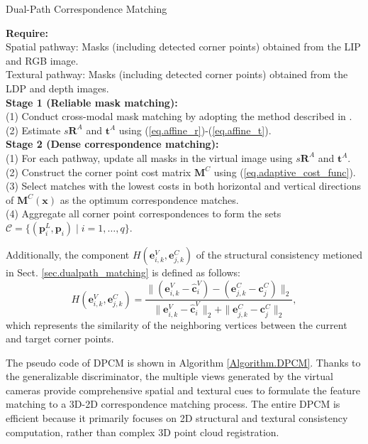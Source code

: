 \begin{algorithm}[t!]
\caption{Dual-Path Correspondence Matching}
\textbf{Require:}\\
Spatial pathway: Masks (including detected corner points) obtained from the LIP and RGB image. \\
Textural pathway: Masks (including detected corner points) obtained from the LDP and depth images.\\
\textbf{Stage 1 (Reliable mask matching):} \\
(1) Conduct cross-modal mask matching by adopting the method described in \cite{zhiwei2024lcec}. \\
(2) Estimate $s\boldsymbol{R}^A$ and $\boldsymbol{t}^A$ using (\ref{eq.affine_r})-(\ref{eq.affine_t}).\\
\textbf{Stage 2 (Dense correspondence matching):} \\
(1) For each pathway, update all masks in the virtual image using $s\boldsymbol{R}^A$ and $\boldsymbol{t}^A$.\\
(2) Construct the corner point cost matrix $\boldsymbol{M}^C$ using (\ref{eq.adaptive_cost_func}).
(3) Select matches with the lowest costs in both horizontal and vertical directions of $\boldsymbol{M}^{C}(\boldsymbol{x})$ as the optimum correspondence matches. \\
(4) Aggregate all corner point correspondences to form the sets $\mathcal{C} = \{(\boldsymbol{p}^L_i,\boldsymbol{p}_i) \mid i = 1,\dots, q\}$.
\label{Algorithm.DPCM}
\end{algorithm} 


Additionally, the component $H(\boldsymbol{e}^V_{i,k},\boldsymbol{e}^C_{j,k})$ of the structural consistency metioned in Sect. \ref{sec.dualpath_matching} is defined as follows:
\begin{equation}
H(\boldsymbol{e}^V_{i,k},\boldsymbol{e}^C_{j,k}) = {\frac{\| (\boldsymbol{e}^V_{i,k} - \hat{\boldsymbol{c}}^V_{i} ) -(\boldsymbol{e}^C_{j,k} - \boldsymbol{c}_j^C )\|_2}{\|  \boldsymbol{e}^V_{i,k} - \hat{\boldsymbol{c}}^V_{i}  \|_2 + \| \boldsymbol{e}^C_{j,k} - \boldsymbol{c}_j^C \|_2}},
\label{eq._struct_similarity}
\end{equation}
which represents the similarity of the neighboring vertices between the current and target corner points.

The pseudo code of DPCM is shown in Algorithm \ref{Algorithm.DPCM}. Thanks to the generalizable discriminator, the multiple views generated by the virtual cameras provide comprehensive spatial and textural cues to formulate the feature matching to a 3D-2D correspondence matching process. The entire DPCM is efficient because it primarily focuses on 2D structural and textural consistency computation, rather than complex 3D point cloud registration. 

